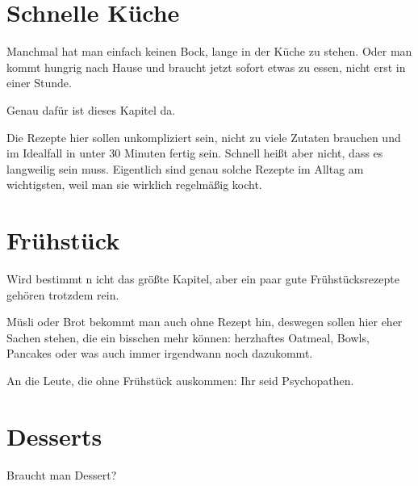\documentclass[
a4paper,
11pt
]{article}
\begin{document}

\section{Schnelle Küche}

Manchmal hat man einfach keinen Bock, lange in der Küche zu stehen. Oder man kommt hungrig nach Hause und braucht jetzt sofort etwas zu essen, nicht erst in einer Stunde.

Genau dafür ist dieses Kapitel da.

Die Rezepte hier sollen unkompliziert sein, nicht zu viele Zutaten brauchen und im Idealfall in unter 30 Minuten fertig sein. Schnell heißt aber nicht, dass es langweilig sein muss. Eigentlich sind genau solche Rezepte im Alltag am wichtigsten, weil man sie wirklich regelmäßig kocht.

\mylocaltableofcontents%
\newpage









\section{Frühstück}

Wird bestimmt n
icht das größte Kapitel, aber ein paar gute Frühstücksrezepte gehören trotzdem rein.

Müsli oder Brot bekommt man auch ohne Rezept hin, deswegen sollen hier eher Sachen stehen, die ein bisschen mehr können: herzhaftes Oatmeal, Bowls, Pancakes oder was auch immer irgendwann noch dazukommt.

An die Leute, die ohne Frühstück auskommen: Ihr seid Psychopathen.

\mylocaltableofcontents%
\newpage





\section{Desserts}
Braucht man Dessert?
\end{document}
